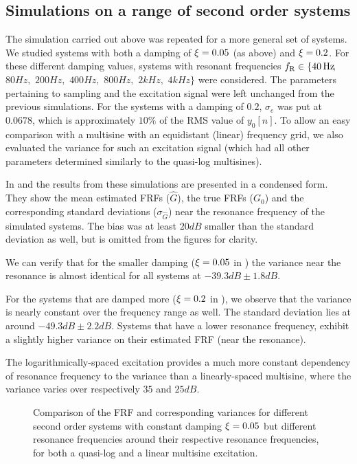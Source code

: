 \subsection{Simulations on a range of second order systems}
The simulation carried out above was repeated for a more general set of systems.
We studied systems with both a damping of $\xi=0.05$ (as above) and $\xi=0.2$.
For these different damping values, systems with resonant frequencies
$f_{\mathrm{R}} \in \{ 40  \,\mathrm{Hz}\!,$
          $ 80  \unit{Hz}\!,$
          $200  \unit{Hz}\!,$
          $400  \unit{Hz}\!,$
          $800  \unit{Hz}\!,$
          $  2 \unit{kHz}\!,$
          $  4 \unit{kHz}\!\}$ were considered.
The parameters pertaining to sampling and the excitation signal were left unchanged
from the previous simulations. For the systems with a damping of $0.2$, $\sigma_e$
was put at $0.0678$, which is approximately $10\%$ of the RMS value of $y_0[n]$.
To allow an easy comparison with a multisine with an equidistant (linear) frequency grid, we also evaluated the variance for such an excitation signal (which had all other parameters determined similarly to the quasi-log multisines).

In  and  the results from these
simulations are presented in a condensed form. 
They show the mean estimated FRFs ($\hat{G}$), the true FRFs ($G_0$) and the corresponding standard deviations ($\sigma_{\hat{G}}$) near the resonance frequency of the simulated systems.
The bias was at least $20\unit{dB}$ smaller than the standard deviation as well, but is omitted from the figures for clarity.

We can verify that for the smaller damping ($\xi=0.05$ in )
the variance near the resonance is almost identical for all systems at $-39.3\unit{dB} \pm 1.8 \unit{dB}$. 

For the systems that are damped more ($\xi=0.2$ in ),
we observe that the variance is nearly constant over the frequency range as well.
The standard deviation lies at around $-49.3 \unit{dB} \pm 2.2\unit{dB}$.
Systems that have a lower resonance frequency, exhibit a slightly higher variance 
on their estimated FRF (near the resonance). 

The logarithmically-spaced excitation provides a much more constant dependency of resonance frequency to the variance than a linearly-spaced multisine, where the variance varies over respectively $35$ and $25 \unit{dB}$.

\begin{figure}%
  \centering
  \setlength{\figurewidth}{0.8\columnwidth}
  \setlength{\figureheight}{5cm}
  
  \caption{Comparison of the FRF and corresponding variances for
           different second order systems with constant damping
           $\xi=0.05$ but different resonance frequencies around
           their respective resonance frequencies, for both a quasi-log 
           and a linear multisine excitation.}%
  \label{fig:damping005}
\end{figure}

